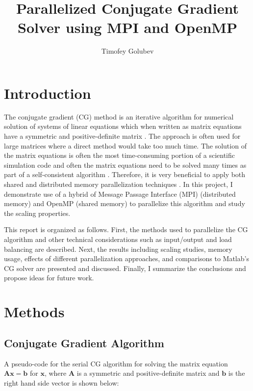 \documentclass{article}
\begin{document}
\title{Parallelized Conjugate Gradient Solver using MPI and OpenMP }
\author{Timofey Golubev}
\maketitle


\section{Introduction} 
The conjugate gradient (CG) method is an iterative algorithm for numerical solution of systems of linear equations which when written as matrix equations have a symmetric and positive-definite matrix \cite{Golub}. The approach is often used for large matrices where a direct method would take too much time. The solution of the matrix equations is often the most time-consuming portion of a scientific simulation code and often the matrix equations need to be solved many times as part of a self-consistent algorithm \cite{Gummel, Gift}. Therefore, it is very beneficial to apply both shared and distributed memory parallelization techniques \cite{openmp_mpi_paper, mpi_openmp_2}. In this project, I demonstrate use of a hybrid of Message Passage Interface (MPI) (distributed memory) and OpenMP (shared memory) to parallelize this algorithm and study the scaling properties. 

This report is organized as follows. First, the methods used to parallelize the CG algorithm and other technical considerations such as input/output and load balancing are described.  Next, the results including scaling studies, memory usage, effects of different parallelization approaches, and comparisons to Matlab's CG solver are presented and discussed. Finally, I summarize the conclusions and propose ideas for future work.

\section{Methods}

\subsection{Conjugate Gradient Algorithm}
A pseudo-code for the serial CG algorithm for solving the matrix equation $\mathbf{Ax} = \mathbf{b}$ for $\mathbf{x}$, where $\mathbf{A}$ is a symmetric and positive-definite matrix and $\mathbf{b}$ is the right hand side vector is shown below:
\end{document}
